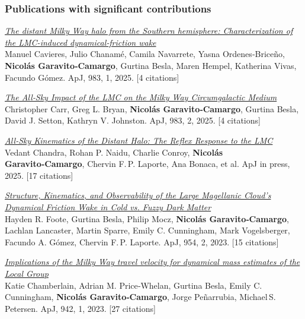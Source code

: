 \documentclass[14pt]{article}
\begin{document}
\subsubsection*{Publications with significant contributions}

\begin{etaremune}
  \setcounter{enumi}{23}
  
  \item \textit{\href{https://ui.adsabs.harvard.edu/abs/2025ApJ...983...83C/abstract}{The distant Milky Way halo from the Southern hemisphere: Characterization of the LMC-induced dynamical‑friction wake}}\\
{ \small \color{darkgray} Manuel Cavieres, Julio Chanam\'e, Camila Navarrete, Yasna Ordenes‑Brice\~no, \textbf{Nicol\'as Garavito‑Camargo}, Gurtina Besla, Maren Hempel, Katherina Vivas, Facundo G\'omez. ApJ, 983, 1, 2025. [4 citations]}

\item \textit{\href{https://ui.adsabs.harvard.edu/abs/2024arXiv240810358C/abstract}{The All‑Sky Impact of the LMC on the Milky Way Circumgalactic Medium}}\\
{ \small \color{darkgray} Christopher Carr, Greg L. Bryan, \textbf{Nicol\'as Garavito‑Camargo}, Gurtina Besla, David J. Setton, Kathryn V. Johnston. ApJ, 983, 2, 2025. [4 citations]}

\item \textit{\href{https://ui.adsabs.harvard.edu/abs/2025ApJ...inpressC/abstract}{All‑Sky Kinematics of the Distant Halo: The Reflex Response to the LMC}}\\
{ \small \color{darkgray} Vedant Chandra, Rohan P. Naidu, Charlie Conroy, \textbf{Nicolás Garavito‑Camargo}, Chervin F. P. Laporte, Ana Bonaca, et al. ApJ in press, 2025. [17 citations]}

\item \textit{\href{https://ui.adsabs.harvard.edu/abs/2023ApJ...954..002F/abstract}{Structure, Kinematics, and Observability of the Large Magellanic Cloud's Dynamical Friction Wake in Cold vs. Fuzzy Dark Matter}}\\
{ \small \color{darkgray} Hayden R. Foote, Gurtina Besla, Philip Mocz, \textbf{Nicol\'as Garavito‑Camargo}, Lachlan Lancaster, Martin Sparre, Emily C. Cunningham, Mark Vogelsberger, Facundo A. Gómez, Chervin F. P. Laporte. ApJ, 954, 2, 2023. [15 citations]}

\item \textit{\href{https://ui.adsabs.harvard.edu/abs/2023ApJ...942...001C/abstract}{Implications of the Milky Way travel velocity for dynamical mass estimates of the Local Group}}\\
{ \small \color{darkgray} Katie Chamberlain, Adrian M. Price‑Whelan, Gurtina Besla, Emily C. Cunningham, \textbf{Nicol\'as Garavito‑Camargo}, Jorge Peñarrubia, Michael S. Petersen. ApJ, 942, 1, 2023. [27 citations]}


\end{etaremune}
\end{document}
